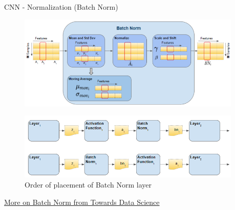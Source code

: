\begin{frame}{CNN - Normalization (Batch Norm)}
    \begin{figure}
    \centering
    \includegraphics[width=0.95\textwidth,height=0.4\textheight,keepaspectratio]{images/batch-norm-unit.png}
    \end{figure}

    \begin{figure}
    \centering
    \includegraphics[width=0.95\textwidth,height=0.4\textheight,keepaspectratio]{images/batch-norm-sequence.png}
    \caption{Order of placement of Batch Norm layer}
    \end{figure}

    \href{https://towardsdatascience.com/batch-norm-explained-visually-how-it-works-and-why-neural-networks-need-it-b18919692739/}{More on Batch Norm from Towards Data Science}
\end{frame}